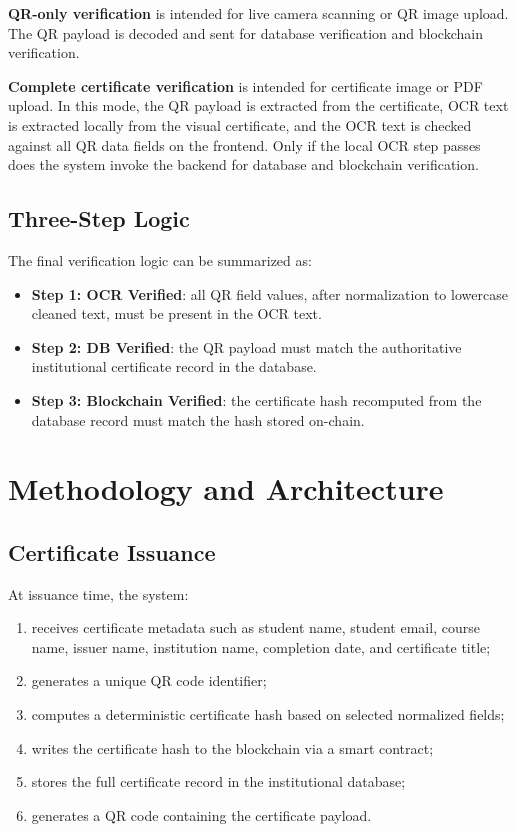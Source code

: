 \documentclass[12pt,a4paper]{article}
\begin{document}
\textbf{QR-only verification} is intended for live camera scanning or QR image upload. The QR payload is decoded and sent for database verification and blockchain verification.

\textbf{Complete certificate verification} is intended for certificate image or PDF upload. In this mode, the QR payload is extracted from the certificate, OCR text is extracted locally from the visual certificate, and the OCR text is checked against all QR data fields on the frontend. Only if the local OCR step passes does the system invoke the backend for database and blockchain verification.

\subsection{Three-Step Logic}
The final verification logic can be summarized as:
\begin{itemize}[leftmargin=1.5em]
\item \textbf{Step 1: OCR Verified}: all QR field values, after normalization to lowercase cleaned text, must be present in the OCR text.
\item \textbf{Step 2: DB Verified}: the QR payload must match the authoritative institutional certificate record in the database.
\item \textbf{Step 3: Blockchain Verified}: the certificate hash recomputed from the database record must match the hash stored on-chain.
\end{itemize}

\section{Methodology and Architecture}
\subsection{Certificate Issuance}
At issuance time, the system:
\begin{enumerate}[leftmargin=1.5em]
\item receives certificate metadata such as student name, student email, course name, issuer name, institution name, completion date, and certificate title;
\item generates a unique QR code identifier;
\item computes a deterministic certificate hash based on selected normalized fields;
\item writes the certificate hash to the blockchain via a smart contract;
\item stores the full certificate record in the institutional database;
\item generates a QR code containing the certificate payload.
\end{enumerate}
\end{document}
